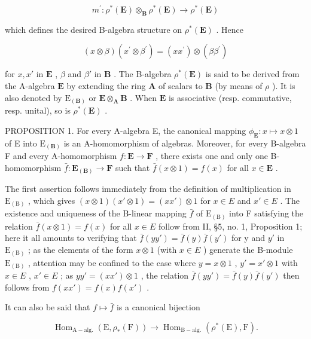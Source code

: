 \[
m ^ {\prime}: \rho^ {*} (\mathbf {E}) \otimes_ {\mathbf {B}} \rho^ {*} (\mathbf {E}) \rightarrow \rho^ {*} (\mathbf {E})
\]

which defines the desired B-algebra structure on \(\rho^{*}(\mathbf{E})\) . Hence

\[
(x \otimes \beta) (x ^ {\prime} \otimes \beta^ {\prime}) = (x x ^ {\prime}) \otimes (\beta \beta^ {\prime})\tag{5}
\]

for \(x, x'\) in \(\mathbf{E}\) , \(\beta\) and \(\beta'\) in \(\mathbf{B}\) . The B-algebra \(\rho^*(\mathbf{E})\) is said to be derived from the A-algebra \(\mathbf{E}\) by extending the ring \(\mathbf{A}\) of scalars to \(\mathbf{B}\) (by means of \(\rho\) ). It is also denoted by \(\mathrm{E}_{(\mathbf{B})}\) or \(\mathbf{E} \otimes_{\mathbf{A}} \mathbf{B}\) . When \(\mathbf{E}\) is associative (resp. commutative, resp. unital), so is \(\rho^*(\mathbf{E})\) .

PROPOSITION 1. For every A-algebra E, the canonical mapping \(\phi_{\mathbf{E}}: x \mapsto x \otimes 1\) of E into \(\mathrm{E}_{(\mathbf{B})}\) is an A-homomorphism of algebras. Moreover, for every B-algebra F and every A-homomorphism \(f: \mathbf{E} \to \mathbf{F}\) , there exists one and only one B-homomorphism \(\bar{f}: \mathbf{E}_{(\mathbf{B})} \to \mathbf{F}\) such that \(\bar{f}(x \otimes 1) = f(x)\) for all \(x \in \mathbf{E}\) .

The first assertion follows immediately from the definition of multiplication in \(\mathrm{E}_{(\mathrm{B})}\) , which gives \((x\otimes1)(x'\otimes1)=(xx')\otimes1\) for \(x\in E\) and \(x'\in E\) . The existence and uniqueness of the B-linear mapping \(\bar{f}\) of \(\mathrm{E}_{(\mathrm{B})}\) into F satisfying the relation \(\bar{f}(x\otimes1)=f(x)\) for all \(x\in E\) follow from II, §5, no. 1, Proposition 1; here it all amounts to verifying that \(\bar{f}(yy')=\bar{f}(y)\bar{f}(y')\) for y and \(y'\) in \(\mathrm{E}_{(\mathrm{B})}\) ; as the elements of the form \(x\otimes1\) (with \(x\in E\) ) generate the B-module \(\mathrm{E}_{(\mathrm{B})}\) , attention may be confined to the case where \(y=x\otimes1\) , \(y'=x'\otimes1\) with \(x\in E\) , \(x'\in E\) ; as \(yy'=(xx')\otimes1\) , the relation \(\bar{f}(yy')=\bar{f}(y)\bar{f}(y')\) then follows from \(f(xx')=f(x)f(x')\) .

It can also be said that \(f \mapsto \bar{f}\) is a canonical bijection

\[
\operatorname{Hom} _ {\mathrm{A-alg.}} (\mathrm{E}, \rho_ {*} (\mathrm{F})) \rightarrow \operatorname{Hom} _ {\mathrm{B-alg.}} (\rho^ {*} (\mathrm{E}), \mathrm{F}).\tag{6}
\]


